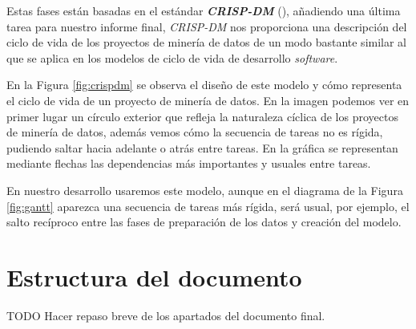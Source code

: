 Estas fases están basadas en el estándar \textbf{\textit{CRISP-DM}} (\cite{crispdm}), añadiendo una última tarea para nuestro informe final, \textit{CRISP-DM} nos proporciona una descripción del ciclo de vida de los proyectos de minería de datos de un modo bastante similar al que se aplica en los modelos de ciclo de vida de desarrollo \textit{software}.


 

En la Figura \ref{fig:crispdm} se observa el diseño de este modelo y cómo representa el ciclo de vida de un proyecto de minería de datos. En la imagen podemos ver en primer lugar un círculo exterior que refleja la naturaleza cíclica de los proyectos de minería de datos, además vemos cómo la secuencia de tareas no es rígida, pudiendo saltar hacia adelante o atrás entre tareas. En la gráfica se representan mediante flechas las dependencias más importantes y usuales entre tareas.

En nuestro desarrollo usaremos este modelo, aunque en el diagrama de la Figura \ref{fig:gantt} aparezca una secuencia de tareas más rígida, será usual, por ejemplo, el salto recíproco entre las fases de preparación de los datos y creación del modelo.


\section{Estructura del documento}
\label{section:intro:estructura}
TODO Hacer repaso breve de los apartados del documento final.
